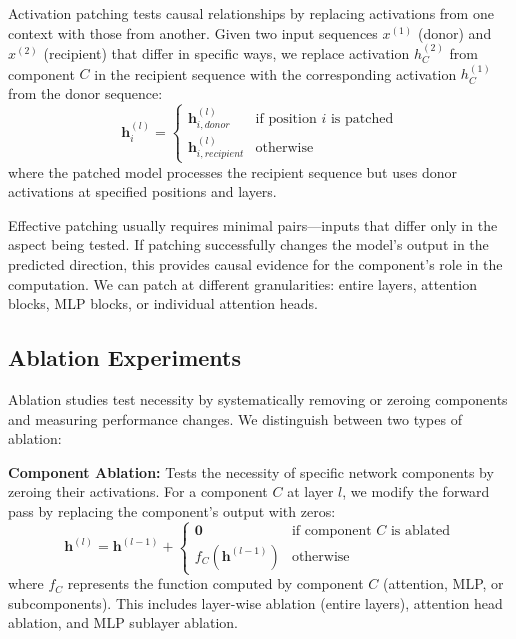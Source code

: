 Activation patching tests causal relationships by replacing activations from one context with those from another. Given two input sequences $x^{(1)}$ (donor) and $x^{(2)}$ (recipient) that differ in specific ways, we replace activation $h_C^{(2)}$ from component $C$ in the recipient sequence with the corresponding activation $h_C^{(1)}$ from the donor sequence:
\begin{equation}
\mathbf{h}_i^{(l)} = \begin{cases}
\mathbf{h}_{i,donor}^{(l)} & \text{if position } i \text{ is patched} \\
\mathbf{h}_{i,recipient}^{(l)} & \text{otherwise}
\end{cases}
\end{equation}
where the patched model processes the recipient sequence but uses donor activations at specified positions and layers.

Effective patching usually requires minimal pairs—inputs that differ only in the aspect being tested. If patching successfully changes the model's output in the predicted direction, this provides causal evidence for the component's role in the computation. We can patch at different granularities: entire layers, attention blocks, MLP blocks, or individual attention heads.

\subsection{Ablation Experiments}

Ablation studies test necessity by systematically removing or zeroing components and measuring performance changes. We distinguish between two types of ablation:

\textbf{Component Ablation:} Tests the necessity of specific network components by zeroing their activations. For a component $C$ at layer $l$, we modify the forward pass by replacing the component's output with zeros:
\begin{equation}
\mathbf{h}^{(l)} = \mathbf{h}^{(l-1)} + \begin{cases}
\mathbf{0} & \text{if component } C \text{ is ablated} \\
f_C(\mathbf{h}^{(l-1)}) & \text{otherwise}
\end{cases}
\end{equation}
where $f_C$ represents the function computed by component $C$ (attention, MLP, or subcomponents). This includes layer-wise ablation (entire layers), attention head ablation, and MLP sublayer ablation.

